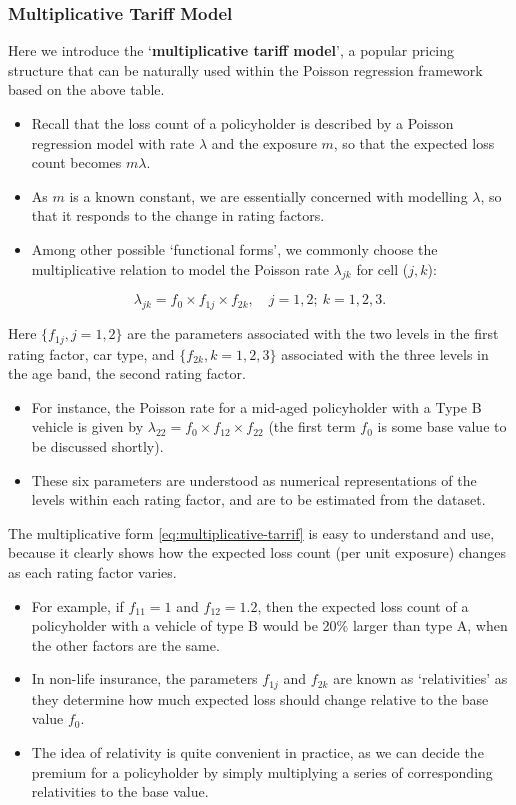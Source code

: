 \documentclass[ignorenonframetext,]{beamer}
\begin{document}
\begin{frame}[allowframebreaks]
\frametitle{Multiplicative Tariff Model}

Here we introduce the `\textbf{multiplicative tariff model}', a popular pricing structure that can be naturally used within the Poisson regression framework based on the above table. 
\begin{itemize}
\item Recall that the loss count of a policyholder is described by a Poisson regression model with rate $\lambda$ and the exposure $m$, so that the expected loss count becomes $m\lambda$. 
\item As $m$ is a known constant, we are essentially concerned with modelling $\lambda$, so that it responds to the change in rating factors. 
\item Among other possible `functional forms', we commonly choose the multiplicative relation to model the Poisson rate $\lambda_{jk}$ for cell ($j,k$):
\end{itemize}

\begin{equation}
\lambda_{jk}= f_0 \times f_{1j} \times f_{2k}, \quad j=1,2; \ k=1, 2,3.
\label{eq:multiplicative-tarrif}
\end{equation}

\framebreak

Here $\{ f_{1j}, j=1,2\}$ are the parameters associated with the two levels in the first rating factor, car type, and  $\{ f_{2k}, k=1,2,3\}$  associated with the three levels in the age band, the second rating factor. 
\begin{itemize}
\item For instance, the Poisson rate for a mid-aged policyholder with a Type B vehicle is given by $\lambda_{22}=f_0 \times f_{12} \times f_{22}$ (the first term $f_0$ is some base value to be discussed shortly).
\item These six parameters are understood as numerical representations of the levels within each rating factor, and are to be estimated from the dataset.  
\end{itemize}

\framebreak

The multiplicative form \eqref{eq:multiplicative-tarrif} is easy to understand and use, because it clearly shows how the expected loss count (per unit exposure) changes as each rating factor varies. 
\begin{itemize}
\item For example, if $f_{11}=1$ and $f_{12}=1.2$, then the expected loss count of a policyholder with a vehicle of type B would be 20$\%$ larger than type A, when the other factors are the same. 
\item In non-life insurance, the parameters $f_{1j}$ and $f_{2k}$  are known as `relativities' as they determine how much expected loss should change relative to the base value $f_0$. 
\item The idea of relativity is quite convenient in practice, as we can decide the premium for a policyholder by simply multiplying a series of corresponding relativities to the base value. 


\end{itemize}
\end{frame}
\end{document}
